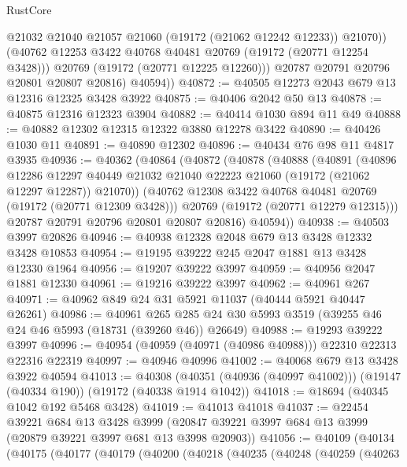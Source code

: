 \begin{lexlean}{RustCore}
\begin{coremodule}
                @21032
                @21040
                @21057
                @21060
                (@19172 (@21062 @12242 @12233))
                @21070))
            (@40762 @12253 @3422 @40768 @40481 @20769 (@19172 (@20771 @12254 @3428)))
            @20769
            (@19172 (@20771 @12225 @12260)))
          @20787
          @20791
          @20796
          @20801
          @20807
          @20816)
        @40594))
@40872 := @40505 @12273 @2043 @679 @13 @12316 @12325 @3428 @3922
@40875 := @40406 @2042 @50 @13
@40878 := @40875 @12316 @12323 @3904
@40882 := @40414 @1030 @894 @11 @49
@40888 := @40882 @12302 @12315 @12322 @3880 @12278 @3422
@40890 := @40426 @1030 @11
@40891 := @40890 @12302
@40896 := @40434 @76 @98 @11 @4817 @3935
@40936 := @40362
    (@40864
      (@40872
        (@40878
          (@40888
            (@40891
              (@40896
                @12286
                @12297
                @40449
                @21032
                @21040
                @22223
                @21060
                (@19172 (@21062 @12297 @12287))
                @21070))
            (@40762 @12308 @3422 @40768 @40481 @20769 (@19172 (@20771 @12309 @3428)))
            @20769
            (@19172 (@20771 @12279 @12315)))
          @20787
          @20791
          @20796
          @20801
          @20807
          @20816)
        @40594))
@40938 := @40503 @3997 @20826
@40946 := @40938 @12328 @2048 @679 @13 @3428 @12332 @3428 @10853
@40954 := @19195 @39222 @245 @2047 @1881 @13 @3428 @12330 @1964
@40956 := @19207 @39222 @3997
@40959 := @40956 @2047 @1881 @12330
@40961 := @19216 @39222 @3997
@40962 := @40961 @267
@40971 := @40962 @849 @24 @31 @5921 @11037 (@40444 @5921 @40447 @26261)
@40986 := @40961
    @265
    @285
    @24
    @30
    @5993
    @3519
    (@39255 @46 @24 @46 @5993 (@18731 (@39260 @46)) @26649)
@40988 := @19293 @39222 @3997
@40996 := @40954 (@40959 (@40971 (@40986 @40988))) @22310 @22313 @22316 @22319
@40997 := @40946 @40996
@41002 := @40068 @679 @13 @3428 @3922 @40594
@41013 := @40308
    (@40351 (@40936 (@40997 @41002)))
    (@19147 (@40334 @190))
    (@19172 (@40338 @1914 @1042))
@41018 := @18694 (@40345 @1042 @192 @5468 @3428)
@41019 := @41013 @41018
@41037 := @22454
    @39221
    @684
    @13
    @3428
    @3999
    (@20847 @39221 @3997 @684 @13 @3999 (@20879 @39221 @3997 @681 @13 @3998 @20903))
@41056 := @40109
    (@40134
      (@40175
        (@40177
          (@40179
            (@40200
              (@40218
                (@40235
                  (@40248
                    (@40259
                      (@40263

\end{coremodule}
\end{lexlean}
